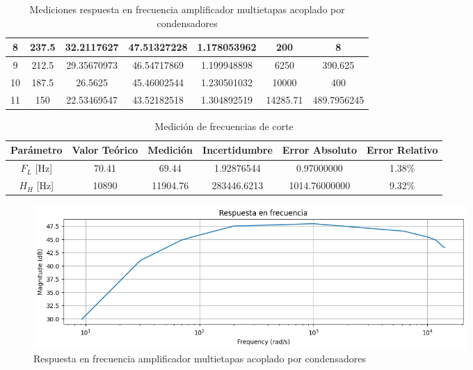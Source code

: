 \begin{table}[h!]
\begin{tabular}{|c|c|c|c|c|c|c|}
8 & 237.5 & 32.2117627 & 47.51327228 & 1.178053962 & 200 & 8 \\ \hline
9 & 212.5 & 29.35670973 & 46.54717869 & 1.199948898 & 6250 & 390.625 \\ \hline
10 & 187.5 & 26.5625 & 45.46002544 & 1.230501032 & 10000 & 400 \\ \hline
11 & 150 & 22.53469547 & 43.52182518 & 1.304892519 & 14285.71 & 489.7956245 \\ \hline
\end{tabular}
\caption{Mediciones respuesta en frecuencia amplificador multietapas acoplado por condensadores}
\label{tab:med-respuesta-frecuencia-amplificador-multietapas-acoplado-condensadores}
\end{table}

\begin{table}[h!]
\centering
\begin{tabular}{|c|c|c|c|c|c|}
\hline
\textbf{Parámetro} & \textbf{Valor Teórico} & \textbf{Medición} & \textbf{Incertidumbre} & \textbf{Error Absoluto} & \textbf{Error Relativo} \\ \hline
$F_L$ [Hz] & 70.41 & 69.44 & 1.92876544 & 0.97000000 & 1.38\% \\ \hline
$H_H$ [Hz] & 10890 & 11904.76 & 283446.6213 & 1014.76000000 & 9.32\% \\ \hline
\end{tabular}
\caption{Medición de frecuencias de corte}
\label{tab:med-frecuencias-corte}
\end{table}


\begin{figure}[ht]
    \centering
    \includegraphics[width=0.8\textwidth]{src/images/resultados/p4/respuesta en frecuencia practica 4 con condensadores.png}
    \caption{Respuesta en frecuencia amplificador multietapas acoplado por condensadores}
    \label{fig:respuesta-frecuencia-amplificador-multietapas-acoplado-condensadores}
\end{figure}

